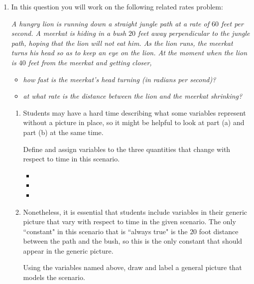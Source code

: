 \documentclass{article}
\begin{document}
\begin{enumerate}
\newpage
\begin{workshop}
    This is an exam-type problem, albeit a bit long and scaffolded.
\end{workshop}
\item In this question you will work on the following related rates problem:

    

\textit{A hungry lion is running down a straight jungle path at a rate of $60$ feet per second.  A meerkat is hiding in a bush $20$ feet away perpendicular to the
jungle path, hoping that the lion will not eat him.  As the lion runs, the meerkat turns his head so as to keep an eye on the lion.  At the moment when the lion is $40$ feet from the meerkat and getting closer,}

    \begin{itemize}
    \item \textit{how fast is the meerkat's head turning (in radians per second)?}
    \item \textit{at what rate is the distance between the lion and the meerkat shrinking?}
    \end{itemize}
\begin{enumerate}
\item 
\begin{workshop}
    Students may have a hard time describing what some variables represent without a picture in place, so it might be helpful to look at part (a) and part (b) at the same time.
\end{workshop}

    Define and assign variables to the three quantities that change with respect to time in this scenario.
    \begin{itemize}
        \item {}\phantom{text}
        \probonly{\newline}
        \item {} \phantom{text}
      \probonly{\newline}
        \item {}\phantom{text}
       \probonly{\newline}
    \end{itemize}
    \item 
    \begin{workshop}
        Nonetheless, it is essential that students include variables in their generic picture that vary with respect to time in the given scenario. The only ``constant" in this scenario that is ``always true" is the $20$ foot distance between the path and the bush, so this is the only constant that should appear in the generic picture.
    \end{workshop}
    Using the variables named above, draw and label a general picture that models the scenario. 
    

\end{enumerate}
\end{enumerate}
\end{document}
